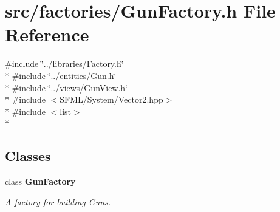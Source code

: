 \section{src/factories/\-Gun\-Factory.h File Reference}
\label{_gun_factory_8h}
{\ttfamily \#include \char`\"{}../libraries/\-Factory.\-h\char`\"{}}\\*
{\ttfamily \#include \char`\"{}../entities/\-Gun.\-h\char`\"{}}\\*
{\ttfamily \#include \char`\"{}../views/\-Gun\-View.\-h\char`\"{}}\\*
{\ttfamily \#include $<$S\-F\-M\-L/\-System/\-Vector2.\-hpp$>$}\\*
{\ttfamily \#include $<$list$>$}\\*
\subsection*{Classes}
\begin{DoxyCompactItemize}
\item 
class {\bf Gun\-Factory}
\begin{DoxyCompactList}\small\item\em A factory for building Guns. \end{DoxyCompactList}\end{DoxyCompactItemize}
